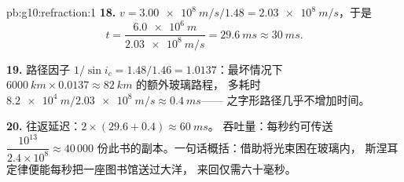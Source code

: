 \begin{solution}{pb:g10:refraction:1}
\textbf{18.} $v = \qty{3.00e8}{m/s}/1.48 = \qty{2.03e8}{m/s}$，于是
\[
t = \frac{\qty{6.0e6}{m}}{\qty{2.03e8}{m/s}} = \qty{29.6}{ms} \approx
\qty{30}{ms}.
\]

\textbf{19.} 路径因子 $1/\sin i_c = 1.48/1.46 = 1.0137$：最坏情况下
$\qty{6000}{km} \times 0.0137 \approx \qty{82}{km}$ 的额外玻璃路程，
多耗时 $\qty{8.2e4}{m} / \qty{2.03e8}{m/s} \approx \qty{0.4}{ms}$——
之字形路径几乎不增加时间。

\textbf{20.} 往返延迟：$2 \times (29.6 + 0.4) \approx \qty{60}{ms}$。
吞吐量：每秒约可传送 $\dfrac{10^{13}}{2.4 \times 10^8} \approx 40\,000$
份此书的副本。一句话概括：借助将光束困在玻璃内，
斯涅耳定律便能每秒把一座图书馆送过大洋，
来回仅需六十毫秒。
\end{solution}
